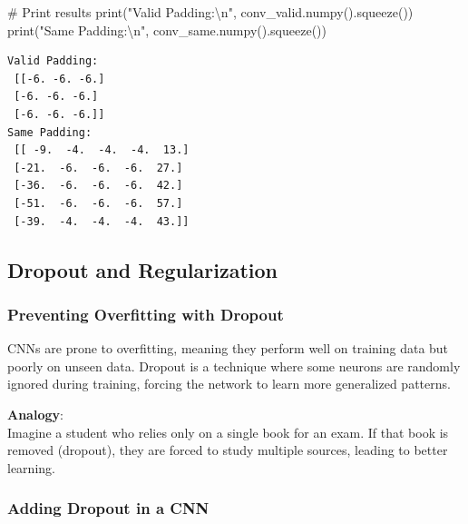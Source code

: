 \documentclass[
  letterpaper,
  DIV=11,
  numbers=noendperiod]{scrreprt}
\newenvironment{Shaded}{\begin{snugshade}}{\end{snugshade}}
\newcommand{\BuiltInTok}[1]{\textcolor[rgb]{0.00,0.23,0.31}{#1}}
\newcommand{\CharTok}[1]{\textcolor[rgb]{0.13,0.47,0.30}{#1}}
\newcommand{\CommentTok}[1]{\textcolor[rgb]{0.37,0.37,0.37}{#1}}
\newcommand{\NormalTok}[1]{\textcolor[rgb]{0.00,0.23,0.31}{#1}}
\newcommand{\StringTok}[1]{\textcolor[rgb]{0.13,0.47,0.30}{#1}}
\begin{document}
\begin{Shaded}
\begin{Highlighting}[]
\CommentTok{\# Print results}
\BuiltInTok{print}\NormalTok{(}\StringTok{"Valid Padding:}\CharTok{\textbackslash{}n}\StringTok{"}\NormalTok{, conv\_valid.numpy().squeeze())}
\BuiltInTok{print}\NormalTok{(}\StringTok{"Same Padding:}\CharTok{\textbackslash{}n}\StringTok{"}\NormalTok{, conv\_same.numpy().squeeze())}
\end{Highlighting}
\end{Shaded}

\begin{verbatim}
Valid Padding:
 [[-6. -6. -6.]
 [-6. -6. -6.]
 [-6. -6. -6.]]
Same Padding:
 [[ -9.  -4.  -4.  -4.  13.]
 [-21.  -6.  -6.  -6.  27.]
 [-36.  -6.  -6.  -6.  42.]
 [-51.  -6.  -6.  -6.  57.]
 [-39.  -4.  -4.  -4.  43.]]
\end{verbatim}

\subsection{Dropout and
Regularization}\label{dropout-and-regularization}

\subsubsection{Preventing Overfitting with
Dropout}\label{preventing-overfitting-with-dropout}

CNNs are prone to overfitting, meaning they perform well on training
data but poorly on unseen data. Dropout is a technique where some
neurons are randomly ignored during training, forcing the network to
learn more generalized patterns.

\textbf{Analogy}:\\
Imagine a student who relies only on a single book for an exam. If that
book is removed (dropout), they are forced to study multiple sources,
leading to better learning.

\subsubsection{Adding Dropout in a CNN}\label{adding-dropout-in-a-cnn}
\end{document}
